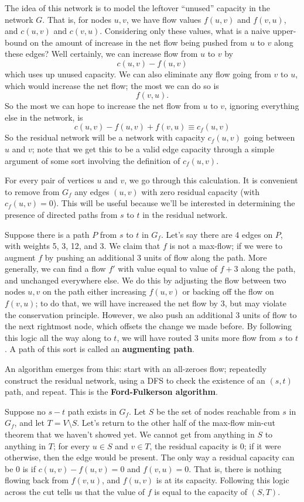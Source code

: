 \documentclass{article}
\begin{document}
The idea of this network is to model the leftover ``unused'' capacity in the
network $G$.
That is, for nodes $u,v$, we have flow values $f(u,v)$
and $f(v,u)$, and $c(u,v)$ and $c(v,u)$. Considering only these values, what
is a naive upper-bound on the amount of increase in the net flow being pushed
from $u$ to $v$ along these edges?
Well certainly, we can increase flow from $u$ to $v$ by
$$
c(u,v) - f(u,v)
$$
which uses up unused capacity.
We can also eliminate any flow going from $v$ to $u$, which would
increase the net flow; the most we can do so is
$$
f(v,u).
$$
So the most we can hope to increase the net flow from $u$ to $v$, ignoring
everything else in the network, is
$$
c(u,v) - f(u,v) + f(v,u)
\equiv c_f(u,v)
$$
So the residual network will be a network with capacity $c_f(u,v)$ going
between $u$ and $v$; note that we get this to be a valid edge capacity
through a simple argument of some sort involving the definition of $c_f(u,v)$.

For every pair of vertices $u$ and $v$, we go through this calculation.
It is convenient to remove from $G_f$ any edges $(u,v)$ with zero
residual capacity (with $c_f(u,v) = 0$).
This will be useful because we'll be interested in determining the presence
of directed paths from $s$ to $t$ in the residual network.

Suppose there is a path $P$ from $s$ to $t$ in $G_f$.
Let's say there are 4 edges on $P$, with weights 5, 3, 12, and 3.
We claim that $f$ is not a max-flow; if we were to augment $f$ by pushing
an additional 3 units of flow along the path.
More generally, we can find a flow $f'$ with value equal to value of $f + 3$
along the path, and unchanged everywhere else.
We do this by adjusting the flow between two nodes $u,v$ on the path either
increasing $f(u,v)$ or backing off the flow on $f(v,u)$; to do that, we
will have increased the net flow by $3$, but may violate the conservation
principle. However, we also push an additional 3 units of flow to the
next rightmost node, which offsets the change we made before.
By following this logic all the way along to $t$, we will have routed
3 units more flow from $s$ to $t$.
A path of this sort is called an \textbf{augmenting path}.

An algorithm emerges from this: start with an all-zeroes flow; repeatedly
construct the residual network, using a DFS to check the existence of an 
$(s,t)$ path, 
and repeat.
This is the \textbf{Ford-Fulkerson algorithm}.

Suppose no $s-t$ path exists in $G_f$.
Let $S$ be the set of nodes reachable from $s$ in $G_f$, and let 
$T = V\setminus S$.
Let's return to the other half of the max-flow min-cut theorem that we haven't
showed yet.
We cannot get from anything in $S$ to anything in $T$; for every $u\in S$
and $v\in T$, the residual capacity is $0$; if it were otherwise, then the
edge would be present.
The only way a residual capacity can be $0$ is if $c(u,v) - f(u,v) = 0$ and $f(v,u) = 0$.
That is, there is nothing flowing back from $f(v,u)$, and $f(u,v)$ is at its
capacity.
Following this logic across the cut tells us that the value of $f$ is equal
to the capacity of $(S,T)$.
\end{document}
